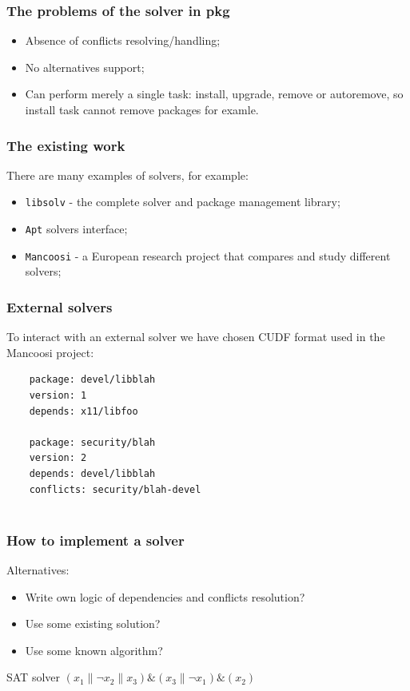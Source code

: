 \documentclass{beamer}
\begin{document}
\begin{frame}
\frametitle{The problems of the solver in pkg}

\begin{itemize}
\item Absence of conflicts resolving/handling;
\item No alternatives support;
\item Can perform merely a single task: install, upgrade, remove or autoremove,
so install task cannot remove packages for examle.
\end{itemize}

\end{frame}


\begin{frame}
\frametitle{The existing work}

There are many examples of solvers, for example:
\begin{itemize}
  \item \texttt{libsolv} - the complete solver and package management library;
  \item \texttt{Apt} solvers interface;
  \item \texttt{Mancoosi} - a European research project that compares and study
  different solvers;
\end{itemize}

\end{frame}

\begin{frame}[fragile]
\frametitle{External solvers}
To interact with an external solver we have chosen CUDF format used in the
Mancoosi project:
\bigskip
{\tiny
	\begin{verbatim}
	package: devel/libblah
	version: 1
	depends: x11/libfoo

	package: security/blah
	version: 2
	depends: devel/libblah
	conflicts: security/blah-devel
	
	\end{verbatim}
}
\end{frame}

\begin{frame}
\frametitle{How to implement a solver}

Alternatives:
\begin{itemize}
  \item Write own logic of dependencies and conflicts resolution?
  \pause
  \item Use some existing solution?
  \pause
  \item Use some known algorithm?
  \pause
\end{itemize}
\bigskip
{\large SAT solver}
\bigskip
$(x_1 \| \neg x_2 \| x_3) \& (x_3 \| \neg x_1) \& (x_2)$
\end{frame}
\end{document}
